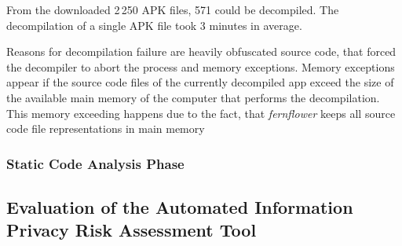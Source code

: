 From the downloaded 2\,250 APK files, 571 could be decompiled. 
The decompilation of a single APK file took 3 minutes in average.

Reasons for decompilation failure are heavily obfuscated source code, that forced the decompiler to abort the process and memory exceptions.
Memory exceptions appear if the source code files of the currently decompiled app exceed the size of the available main memory of the computer that performs the decompilation.
This memory exceeding happens due to the fact, that \textit{fernflower} keeps all source code file representations in main memory

\subsubsection{Static Code Analysis Phase}


\subsection{Evaluation of the Automated Information Privacy Risk Assessment Tool}